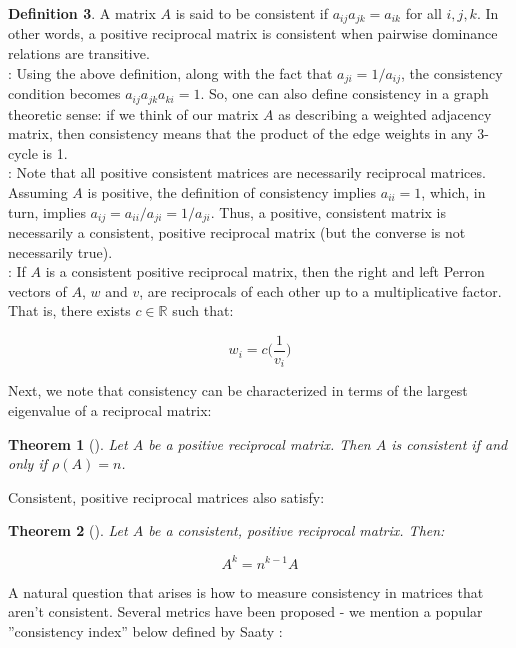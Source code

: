 \documentclass[a4,11pt,twoside,leqno]{report}
\newtheorem{thm}{Theorem}[section]
\theoremstyle{definition}
\newtheorem{defn}[thm]{Definition}
\theoremstyle{remark}
\numberwithin{equation}{section}
\begin{document}
\begin{defn} A matrix $A$ is said to be consistent if $a_{ij}a_{jk}=a_{ik}$ for all $i,j,k$. In other words, a positive reciprocal matrix is consistent when pairwise dominance relations are transitive. \\

: Using the above definition, along with the fact that $a_{ji}=1/{a_{ij}}$, the consistency condition becomes $a_{ij}a_{jk}a_{ki}=1$. So, one can also define consistency in a graph theoretic sense: if we think of our matrix $A$ as describing a weighted adjacency matrix, then consistency means that the product of the edge weights in any 3-cycle is 1. \\

: Note that all positive consistent matrices are necessarily reciprocal matrices. Assuming $A$ is positive, the definition of consistency implies $a_{ii}=1$, which, in turn, implies $a_{ij}=a_{ii}/a_{ji}=1/a_{ji}$. Thus, a positive, consistent matrix is necessarily a consistent, positive reciprocal matrix (but the converse is not necessarily true). \\

: If $A$ is a consistent positive reciprocal matrix, then the right and left Perron vectors of $A$, $w$ and $v$, are reciprocals of each other up to a multiplicative factor. That is, there exists $c\in \mathbb{R}$ such that:

$$w_i=c\Big(\frac{1}{v_i}\Big)$$

 Next, we note that consistency can be characterized in terms of the largest eigenvalue of a reciprocal matrix:

\begin{thm}[\cite{analytic}] Let $A$ be a positive reciprocal matrix. Then $A$ is consistent if and only if $\rho(A)=n$.

\end{thm}

Consistent, positive reciprocal matrices also satisfy:

\begin{thm}[\cite{analytic}] Let $A$ be a consistent, positive reciprocal matrix. Then:

$$A^k=n^{k-1}A$$

\end{thm}

A natural question that arises is how to measure consistency in matrices that aren't consistent. Several metrics have been proposed - we mention a popular ''consistency index'' below defined by Saaty \cite{analytic}:


\end{defn}
\end{document}

